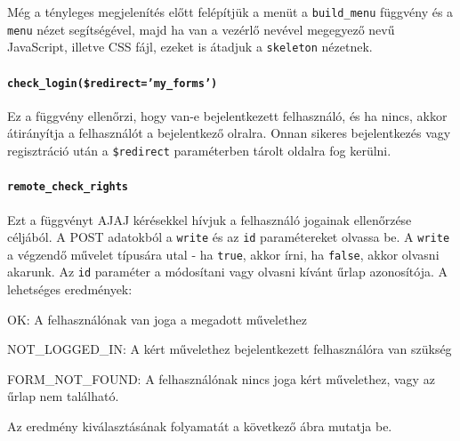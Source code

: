 \documentclass[12pt,a4paper,twoside]{article}
\newcommand{\desc}{
  \begin{description}{}{}
    \setlength\itemsep{0pt}
    \setlength\parskip{0pt}
    \setlength\topsep{0pt}
    \setlength\partopsep{0pt}
    \small}
\newcommand{\ed}{
  \end{description}
}
\begin{document}
Még a tényleges megjelenítés előtt felépítjük a menüt a \texttt{build\_menu}
függvény és a \texttt{menu} nézet segítségével, majd ha van a vezérlő nevével
megegyező nevű JavaScript, illetve CSS fájl, ezeket is átadjuk a
\texttt{skeleton} nézetnek.

\paragraph{\texttt{check\_login(\$redirect='my\_forms')}}
Ez a függvény ellenőrzi, hogy van-e bejelentkezett felhasználó, és ha nincs,
akkor átirányítja a felhasználót a bejelentkező olralra. Onnan sikeres
bejelentkezés vagy regisztráció után a \texttt{\$redirect} paraméterben tárolt
oldalra fog kerülni.

\paragraph{\texttt{remote\_check\_rights}}
\label{par:check_rights}

Ezt a függvényt AJAJ kérésekkel hívjuk a felhasználó jogainak ellenőrzése
céljából. A POST adatokból a \texttt{write} és az \texttt{id} paramétereket
olvassa be. A \texttt{write} a végzendő művelet típusára utal - ha
\texttt{true}, akkor írni, ha \texttt{false}, akkor olvasni akarunk.
Az \texttt{id} paraméter a módosítani vagy olvasni kívánt űrlap azonosítója.
A lehetséges eredmények:

\desc
  \item[OK:] A felhasználónak van joga a megadott művelethez
  \item[NOT\_LOGGED\_IN:] A kért művelethez bejelentkezett felhasználóra van szükség
  \item[FORM\_NOT\_FOUND:] A felhasználónak nincs joga kért művelethez, vagy az űrlap
    nem található.
\ed

Az eredmény kiválasztásának folyamatát a következő ábra mutatja be.
\end{document}
